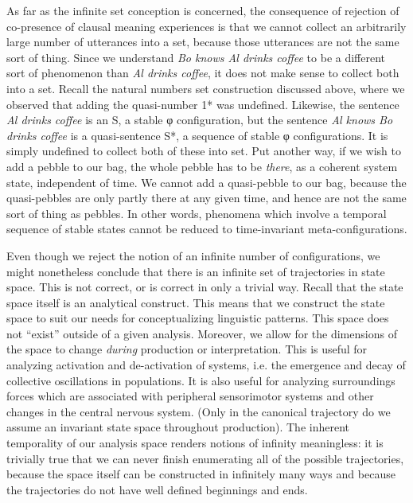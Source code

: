   As far as the infinite set conception is concerned, the consequence of rejection of co-presence of clausal meaning experiences is that we cannot collect an arbitrarily large number of utterances into a set, because those utterances are not the same sort of thing. Since we understand \textit{Bo knows Al drinks coffee} to be a different sort of phenomenon than \textit{Al drinks coffee}, it does not make sense to collect both into a set. Recall the natural numbers set construction discussed above, where we observed that adding the quasi-number 1* was undefined. Likewise, the sentence \textit{Al drinks coffee} is an S, a stable φ configuration, but the sentence \textit{Al knows Bo drinks coffee} is a quasi-sentence S*, a sequence of stable φ configurations. It is simply undefined to collect both of these into set. Put another way, if we wish to add a pebble to our bag, the whole pebble has to be \textit{there}, as a coherent system state, independent of time. We cannot add a quasi-pebble to our bag, because the quasi-pebbles are only partly there at any given time, and hence are not the same sort of thing as pebbles. In other words, phenomena which involve a temporal sequence of stable states cannot be reduced to time-invariant meta-configurations.

  Even though we reject the notion of an infinite number of configurations, we might nonetheless conclude that there is an infinite set of trajectories in state space. This is not correct, or is correct in only a trivial way. Recall that the state space itself is an analytical construct. This means that we construct the state space to suit our needs for conceptualizing linguistic patterns. This space does not “exist” outside of a given analysis. Moreover, we allow for the dimensions of the space to change \textit{during} production or interpretation. This is useful for analyzing activation and de-activation of systems, i.e. the emergence and decay of collective oscillations in populations. It is also useful for analyzing surroundings forces which are associated with peripheral sensorimotor systems and other changes in the central nervous system.  (Only in the canonical trajectory do we assume an invariant state space throughout production). The inherent temporality of our analysis space renders notions of infinity meaningless: it is trivially true that we can never finish enumerating all of the possible trajectories, because the space itself can be constructed in infinitely many ways and because the trajectories do not have well defined beginnings and ends.

